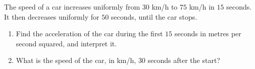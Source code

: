 The speed of a car increases uniformly from $30$ km/h to $75$ km/h in $15$ seconds. It then decreases uniformly for $50$ seconds, until the car stops.
\begin{enumerate}
\item[(a)] Find the acceleration of the car during the first $15$ seconds in metres per second squared, and interpret it.
\item[(b)] What is the speed of the car, in km/h, $30$ seconds after the start?
\end{enumerate}
